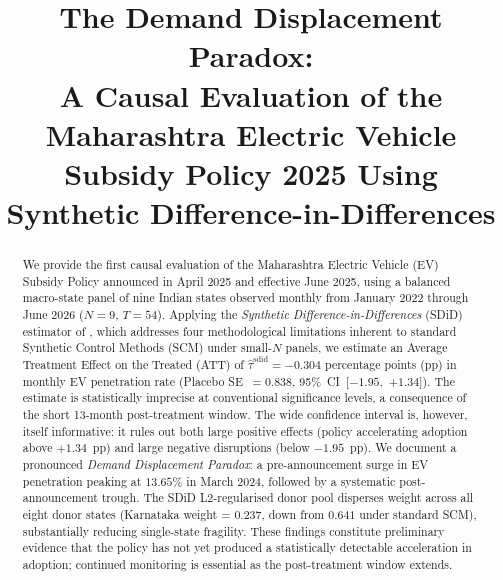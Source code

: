 \documentclass[journal]{IEEEtran}
\begin{document}
\title{The Demand Displacement Paradox:\\ 
A Causal Evaluation of the Maharashtra Electric Vehicle\\ 
Subsidy Policy 2025 Using Synthetic Difference-in-Differences}

\author{
}

\maketitle

\begin{abstract}
We provide the first causal evaluation of the Maharashtra Electric Vehicle
(EV) Subsidy Policy announced in April 2025 and effective June 2025, using a
balanced macro-state panel of nine Indian states observed monthly from January
2022 through June 2026 (\(N = 9\), \(T = 54\)). Applying the
\emph{Synthetic Difference-in-Differences} (SDiD) estimator of
\citet{Arkhangelsky2021}, which addresses four methodological limitations
inherent to standard Synthetic Control Methods (SCM) under small-$N$
panels, we estimate an Average Treatment Effect on the Treated (ATT) of
\(\hat{\tau}^{\mathrm{sdid}} = -0.304\) percentage points (pp) in monthly EV
penetration rate (Placebo SE~$= 0.838$, 95\%~CI~[$-1.95$,~$+1.34$]).
The estimate is statistically imprecise at conventional significance levels,
a consequence of the short 13-month post-treatment window. The wide
confidence interval is, however, itself informative: it rules out both large
positive effects (policy accelerating adoption above $+1.34$~pp) and large
negative disruptions (below $-1.95$~pp). We document a pronounced 
\emph{Demand Displacement Paradox}: a pre-announcement surge in EV
penetration peaking at $13.65$\% in March 2024, followed by a systematic
post-announcement trough. The SDiD L2-regularised donor pool disperses
weight across all eight donor states (Karnataka weight = $0.237$, down from
$0.641$ under standard SCM), substantially reducing single-state
fragility. These findings constitute preliminary evidence that the policy has
not yet produced a statistically detectable acceleration in adoption; continued
monitoring is essential as the post-treatment window extends.
\end{abstract}
\end{document}
